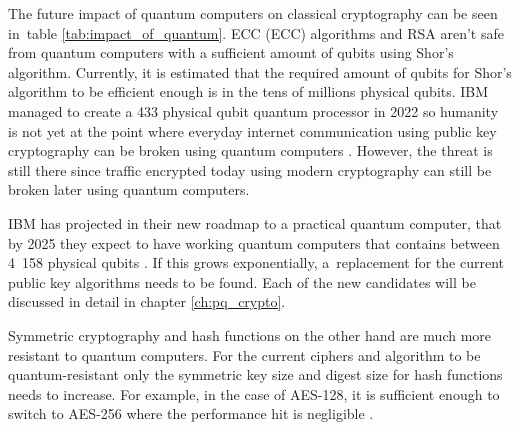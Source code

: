 The future impact of quantum computers on classical cryptography can be seen in~table \ref{tab:impact_of_quantum}. ECC (\acl{ECC}) algorithms and RSA aren't safe from quantum computers with a sufficient amount of qubits using Shor's algorithm. Currently, it is estimated that the required amount of qubits for Shor's algorithm to be efficient enough is in the tens of millions \cite{Bernstein149}\cite{Mosca2015} physical qubits. IBM managed to create a 433 physical qubit quantum processor in 2022 so humanity is not yet at the point where everyday internet communication using public key cryptography can be broken using quantum computers \cite{0MBNdFRCTLK35MFY}. However, the threat is still there since traffic encrypted today using modern cryptography can still be broken later using quantum computers.

IBM has projected in their new roadmap to a practical quantum computer, that by 2025 they expect to have working quantum computers that contains between 4~158 physical qubits \cite{Gambetta2021}. If this grows exponentially, a~replacement for the current public key algorithms needs to be found. Each of the new candidates will be discussed in detail in chapter \ref{ch:pq_crypto}.

Symmetric cryptography and hash functions on the other hand are much more resistant to quantum computers. For the current ciphers and algorithm to be quantum-resistant only the symmetric key size and digest size for hash functions needs to increase. For example, in the case of AES-128, it is sufficient enough to switch to AES-256 where the performance hit is negligible \cite{Bernstein149}.

